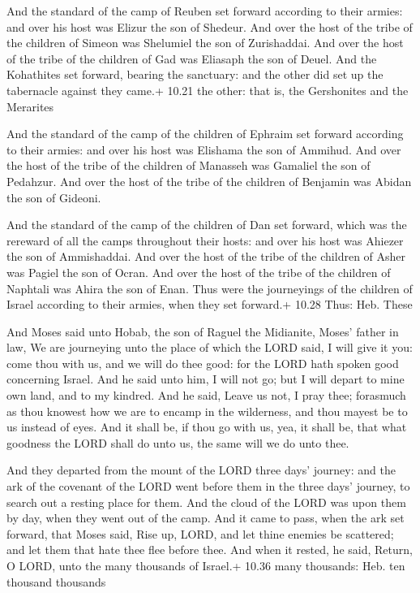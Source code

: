  And the standard of the camp of Reuben set forward
according to their armies: and over his host was Elizur the son of
Shedeur.  And over the host of the tribe of the children of
Simeon was Shelumiel the son of Zurishaddai.  And over the
host of the tribe of the children of Gad was Eliasaph the son of Deuel.
 And the Kohathites set forward, bearing the sanctuary: and
the other did set up the tabernacle against they came.+ 10.21 the other:
that is, the Gershonites and the Merarites

 And the standard of the camp of the children of Ephraim
set forward according to their armies: and over his host was Elishama
the son of Ammihud.  And over the host of the tribe of the
children of Manasseh was Gamaliel the son of Pedahzur.  And
over the host of the tribe of the children of Benjamin was Abidan the
son of Gideoni.

 And the standard of the camp of the children of Dan set
forward, which was the rereward of all the camps throughout their hosts:
and over his host was Ahiezer the son of Ammishaddai.  And
over the host of the tribe of the children of Asher was Pagiel the son
of Ocran.  And over the host of the tribe of the children
of Naphtali was Ahira the son of Enan.  Thus were the
journeyings of the children of Israel according to their armies, when
they set forward.+ 10.28 Thus: Heb. These

 And Moses said unto Hobab, the son of Raguel the
Midianite, Moses' father in law, We are journeying unto the place of
which the LORD said, I will give it you: come thou with us, and we will
do thee good: for the LORD hath spoken good concerning Israel.
 And he said unto him, I will not go; but I will depart to
mine own land, and to my kindred.  And he said, Leave us
not, I pray thee; forasmuch as thou knowest how we are to encamp in the
wilderness, and thou mayest be to us instead of eyes.  And
it shall be, if thou go with us, yea, it shall be, that what goodness
the LORD shall do unto us, the same will we do unto thee.

 And they departed from the mount of the LORD three days'
journey: and the ark of the covenant of the LORD went before them in the
three days' journey, to search out a resting place for them.
 And the cloud of the LORD was upon them by day, when they
went out of the camp.  And it came to pass, when the ark
set forward, that Moses said, Rise up, LORD, and let thine enemies be
scattered; and let them that hate thee flee before thee. 
And when it rested, he said, Return, O LORD, unto the many thousands of
Israel.+ 10.36 many thousands: Heb. ten thousand thousands

